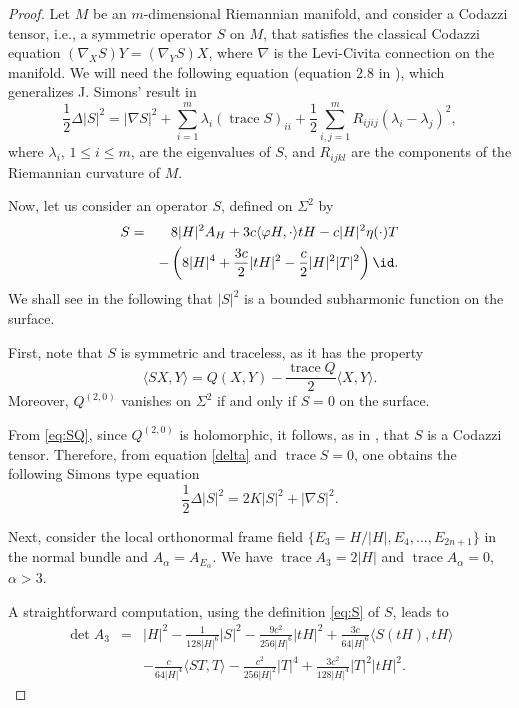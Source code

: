 \documentclass[11pt]{amsart}
\theoremstyle{plain}
\theoremstyle{definition}
\DeclareMathOperator{\trace}{trace} \DeclareMathOperator{\di}{div}
\numberwithin{equation}{section}
\begin{document}
\begin{proof}
Let $M$ be an $m$-dimensional Riemannian manifold, and consider a Codazzi tensor, i.e., a symmetric operator $S$ on $M$, that satisfies the classical Codazzi equation $(\nabla_XS)Y=(\nabla_YS)X$, where $\nabla$ is the Levi-Civita connection on the manifold. We will need the following equation (equation $2.8$ in \cite{CY}), which generalizes J. Simons' result in \cite{JS}
\begin{equation}\label{delta}
\frac{1}{2}\Delta|S|^2=|\nabla S|^2+\sum_{i=1}^{m}\lambda_i(\trace S)_{ii}+\frac{1}{2}\sum_{i,j=1}^{m}R_{ijij}(\lambda_i-\lambda_j)^2,
\end{equation}
where $\lambda_i$, $1\leq i\leq m$, are the eigenvalues of $S$, and $R_{ijkl}$ are the components of the Riemannian curvature of $M$.

Now, let us consider an operator $S$, defined on $\Sigma^2$ by
\begin{eqnarray}\label{eq:S}
S&=&8|H|^2A_H+3c\langle \varphi H,\cdot\rangle tH-c|H|^2\eta(\cdot)T\\\nonumber&&-\left(8|H|^4+\frac{3c}{2}|tH|^2-\frac{c}{2}|H|^2|T|^2\right)\id.
\end{eqnarray}
We shall see in the following that $|S|^2$ is a bounded subharmonic function on the surface.

First, note that $S$ is symmetric and traceless, as it has the property
\begin{equation}\label{eq:SQ}
\langle SX,Y\rangle=Q(X,Y)-\frac{\trace Q}{2}\langle X,Y\rangle.
\end{equation}
Moreover, $Q^{(2,0)}$ vanishes on $\Sigma^2$ if and only if $S=0$ on the surface.

From \eqref{eq:SQ}, since $Q^{(2,0)}$ is holomorphic, it follows, as in \cite[Proposition 3.3]{B}, that $S$ is a Codazzi tensor. Therefore, from equation \eqref{delta} and $\trace S=0$, one obtains the following Simons type equation
\begin{equation}\label{eq:Simons}
\frac{1}{2}\Delta|S|^2=2K|S|^2+|\nabla S|^2.
\end{equation}

Next, consider the local orthonormal frame field $\{E_3=H/|H|,E_4,\ldots,E_{2n+1}\}$ in the normal bundle and $A_{\alpha}=A_{E_{\alpha}}$. We have $\trace A_3=2|H|$ and $\trace A_{\alpha}=0$, $\alpha>3$.

A straightforward computation, using the definition \eqref{eq:S} of $S$, leads to
\begin{eqnarray*}
\det A_3&=&|H|^2-\frac{1}{128|H|^6}|S|^2-\frac{9c^2}{256|H|^6}|tH|^2+\frac{3c}{64|H|^6}\langle S(tH),tH\rangle\\&&-\frac{c}{64|H|^4}\langle ST,T\rangle-\frac{c^2}{256|H|^2}|T|^4+\frac{3c^2}{128|H|^4}|T|^2|tH|^2.
\end{eqnarray*}


\end{proof}
\end{document}
